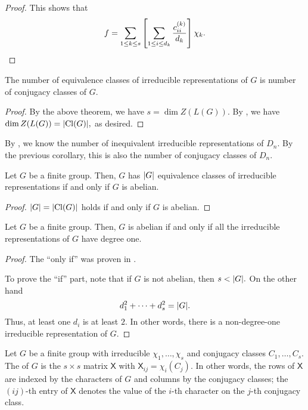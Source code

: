 \begin{proof}
	This shows that
	\begin{equation*} 
		f = \sum_{1 \le k \le s} \left[\sum_{1 \le i \le d_k}\frac{c_{ii}^{(k)}}{d_k}\right]\chi_k. \qedhere
	\end{equation*}
\end{proof}

\begin{cor} \label{cor:numirredrepsconjclass}
	The number of equivalence classes of irreducible representations of $G$ is number of conjugacy classes of $G.$
\end{cor}
\begin{proof} 
	By the above theorem, we have $s = \dim Z(L(G)).$ By , we have $\dim Z(L(G)) = {\left\lvert \operatorname{Cl}(G) \right\lvert},$ as desired.
\end{proof}

\begin{ex}
	By , we know the number of inequivalent irreducible representations of $D_n.$ By the previous corollary, this is also the number of conjugacy classes of $D_n.$
\end{ex}

\begin{cor} \label{cor:numberofirredrepsofG}
	Let $G$ be a finite group. Then, $G$ has ${\left\lvert G \right\lvert}$ equivalence classes of irreducible representations if and only if $G$ is abelian.
\end{cor}
\begin{proof} 
	${\left\lvert G \right\lvert} = {\left\lvert \operatorname{Cl}(G) \right\lvert}$ holds if and only if $G$ is abelian.
\end{proof}

\begin{cor}
	Let $G$ be a finite group. Then, $G$ is abelian if and only if all the irreducible representations of $G$ have degree one.
\end{cor}
\begin{proof} 
	The ``only if'' was proven in .

	To prove the ``if'' part, note that if $G$ is not abelian, then $s < {\left\lvert G \right\lvert}.$ On the other hand
	\begin{equation*} 
		d_1^2 + \cdots + d_s^2 = {\left\lvert G \right\lvert}.
	\end{equation*}
	Thus, at least one $d_i$ is at least $2.$ In other words, there is a non-degree-one irreducible representation of $G.$
\end{proof}

\begin{defn}%
	\label{defn:charactertable}
	Let $G$ be a finite group with irreducible $\chi_1, \ldots, \chi_s$ and conjugacy classes $C_1, \ldots, C_s.$ The  of $G$ is the $s \times s$ matrix $\mathsf{X}$ with $\mathsf{X}_{ij} = \chi_i(C_j).$ In other words, the rows of $\mathsf{X}$ are indexed by the characters of $G$ and columns by the conjugacy classes; the $(ij)$-th entry of $\mathsf{X}$ denotes the value of the $i$-th character on the $j$-th conjugacy class.
\end{defn}

